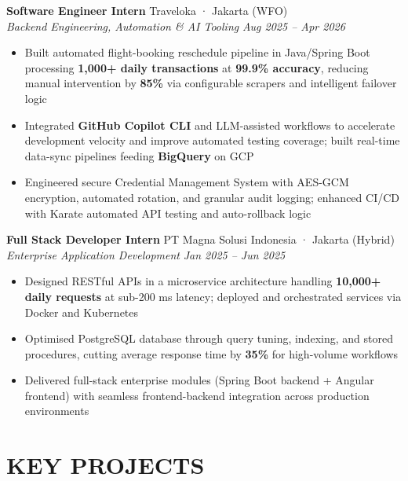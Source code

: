 \documentclass[10pt,a4paper]{article}
\newcommand{\experienceheader}[4]{
    \textbf{#1} \hfill #2 \\
    \textit{#3} \hfill \textit{#4}
}
\begin{document}
\experienceheader{Software Engineer Intern}{Traveloka · Jakarta (WFO)}{Backend Engineering, Automation \& AI Tooling}{Aug 2025 -- Apr 2026}
\begin{itemize}[leftmargin=*, itemsep=0.5pt, topsep=0.5pt]
    \item Built automated flight-booking reschedule pipeline in Java/Spring Boot processing \textbf{1,000+ daily transactions} at \textbf{99.9\% accuracy}, reducing manual intervention by \textbf{85\%} via configurable scrapers and intelligent failover logic
    \item Integrated \textbf{GitHub Copilot CLI} and LLM-assisted workflows to accelerate development velocity and improve automated testing coverage; built real-time data-sync pipelines feeding \textbf{BigQuery} on GCP
    \item Engineered secure Credential Management System with AES-GCM encryption, automated rotation, and granular audit logging; enhanced CI/CD with Karate automated API testing and auto-rollback logic
\end{itemize}

\vspace{1pt}

\experienceheader{Full Stack Developer Intern}{PT Magna Solusi Indonesia · Jakarta (Hybrid)}{Enterprise Application Development}{Jan 2025 -- Jun 2025}
\begin{itemize}[leftmargin=*, itemsep=0.5pt, topsep=0.5pt]
    \item Designed RESTful APIs in a microservice architecture handling \textbf{10,000+ daily requests} at sub-200 ms latency; deployed and orchestrated services via Docker and Kubernetes
    \item Optimised PostgreSQL database through query tuning, indexing, and stored procedures, cutting average response time by \textbf{35\%} for high-volume workflows
    \item Delivered full-stack enterprise modules (Spring Boot backend + Angular frontend) with seamless frontend-backend integration across production environments
\end{itemize}

\vspace{-3pt}

\section*{KEY PROJECTS}
\end{document}
